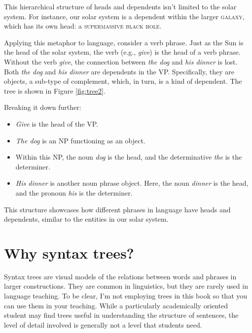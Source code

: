 This hierarchical structure of heads and dependents isn't limited to the solar system. For instance, our solar system is a dependent within the larger \textsc{galaxy}, which has its own head: a \textsc{supermassive black hole}.

Applying this metaphor to language, consider a verb phrase. Just as the Sun is the head of the solar system, the verb (e.g., \textit{give}) is the head of a verb phrase. Without the verb \textit{give}, the connection between \textit{the dog} and \textit{his dinner} is lost. Both \textit{the dog} and \textit{his dinner} are dependents in the VP. Specifically, they are objects, a sub-type of complement, which, in turn, is a kind of dependent. The tree is shown in Figure \ref{fig:tree2}.


Breaking it down further:
\begin{itemize}[noitemsep]
    \item \textit{Give} is the head of the VP.
    \item \textit{The dog} is an NP functioning as an object. 
    \item Within this NP, the noun \textit{dog} is the head, and the determinative \textit{the} is the determiner.
    \item \textit{His dinner} is another noun phrase object. Here, the noun \textit{dinner} is the head, and the pronoun \textit{his} is the determiner.
\end{itemize}

This structure showcases how different phrases in language have heads and dependents, similar to the entities in our solar system.

\section{Why syntax trees?} \label{sec:why-trees}

Syntax trees are visual models of the relations between words and phrases in larger constructions. They are common in linguistics, but they are rarely used in language teaching. To be clear, I'm not employing trees in this book so that you can use them in your teaching. While a particularly academically oriented student may find trees useful in understanding the structure of sentences, the level of detail involved is generally not a level that students need.

